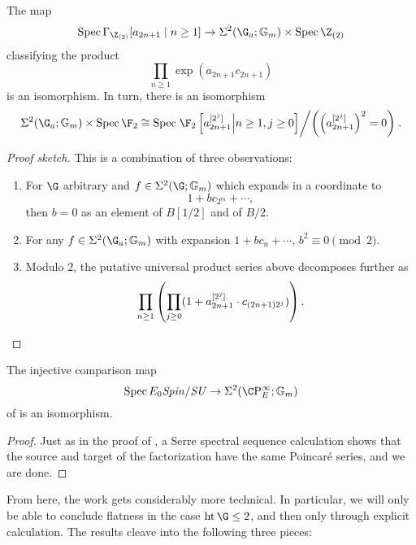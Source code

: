 \begin{lemma}
The map \[\Spec \Gamma_{\Z_{(2)}}[a_{2n + 1} \mid n \ge 1] \to \Sigma^2(\G_a; \Gm) \times \Spec \Z_{(2)}\] classifying the product \[\prod_{n \ge 1} \exp(a_{2n+1} c_{2n+1})\] is an isomorphism.  In turn, there is an isomorphism \[\Sigma^2(\G_a; \Gm) \times \Spec \F_2 \cong \Spec \left.\F_2\left[a_{2n+1}^{[2^j]} \middle| n \ge 1, j \ge 0\right] \middle/ \left(\left(a_{2n+1}^{[2^j]}\right)^2 = 0\right)\right. .\]
\end{lemma}
\begin{proof}[Proof sketch]
This is a combination of three observations:
\begin{enumerate}
    \item For $\G$ arbitrary and $f \in \Sigma^2(\G; \Gm)$ which expands in a coordinate to \[1 + b c_{2^m} + \cdots,\] then $b = 0$ as an element of $B[1/2]$ and of $B/2$.
    \item For any $f \in \Sigma^2(\G_a; \Gm)$ with expansion $1 + b c_n + \cdots$, $b^2 \equiv 0 \pmod{2}$.
    \item Modulo $2$, the putative universal product series above decomposes further as \[\prod_{n \ge 1} \left(\prod_{j \ge 0} (1 + a_{2n+1}^{[2^j]} \cdot c_{(2n+1)2^j})\right). \qedhere\]
\end{enumerate}
\end{proof}

\begin{corollary}
The injective comparison map \[\Spec E_0 \Spin/\SU \to \Sigma^2(\CP^\infty_E; \Gm)\] of  is an isomorphism.
\end{corollary}
\begin{proof}
Just as in the proof of , a Serre spectral sequence calculation shows that the source and target of the factorization have the same Poincar\'e series, and we are done.
\end{proof}

From here, the work gets considerably more technical.  In particular, we will only be able to conclude flatness in the case $\height \G \le 2$, and then only through explicit calculation.  The results cleave into the following three pieces:

